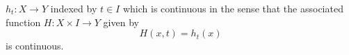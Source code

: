 \documentclass[preview]{standalone}
\begin{document}
\begin{center}
$h_t : X \to Y$ indexed by $t \in I$ which is continuous in the sense that the associated function $H : X \times I \to Y$ given by $$H(x,t) = h_t(x)$$ is continuous.
\end{center}
\end{document}
